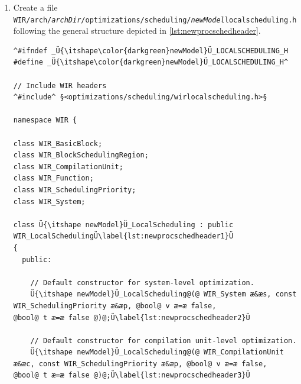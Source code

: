 \begin{enumerate}
\begin{lstlisting}[style=code,float=!ht,xleftmargin=10mm,aboveskip=-0.8 \baselineskip,belowskip=-0.8 \baselineskip]
Ü{\itshape archDir}Üschedincludedir     = ${includedir}/arch/Ü{\itshape archDir}Ü/optimizations/scheduling
Ü{\itshape archDir}Üschedinclude_HEADERS= arch/Ü{\itshape archDir}Ü/optimizations/scheduling/Ü{\itshape newModel}Üblockschedulingregion.h \
                             arch/Ü{\itshape archDir}Ü/optimizations/scheduling/Ü{\itshape newModel}Ülocalscheduling.h \
                             arch/Ü{\itshape archDir}Ü/optimizations/scheduling/Ü{\itshape newModel}Ümaxdelaypriority.h \
                             arch/Ü{\itshape archDir}Ü/optimizations/scheduling/Ü{\itshape newModel}Ümobilitypriority.h \
                             arch/Ü{\itshape archDir}Ü/optimizations/scheduling/Ü{\itshape newModel}Ünoofsuccspriority.h
\end{lstlisting}

  \item Create a file \texttt{WIR/arch/{\itshape archDir}/optimizations/scheduling/{\itshape newModel}localscheduling.h} following the general structure depicted in \cref{lst:newprocschedheader}.

\begin{lstlisting}[style=code,float=!t,caption={Header File for a New Processor Model's Local Instruction Scheduler},label=lst:newprocschedheader]
^#ifndef _Ü{\itshape\color{darkgreen}newModel}Ü_LOCALSCHEDULING_H
#define _Ü{\itshape\color{darkgreen}newModel}Ü_LOCALSCHEDULING_H^

// Include WIR headers
^#include^ §<optimizations/scheduling/wirlocalscheduling.h>§

namespace WIR {

class WIR_BasicBlock;
class WIR_BlockSchedulingRegion;
class WIR_CompilationUnit;
class WIR_Function;
class WIR_SchedulingPriority;
class WIR_System;

class Ü{\itshape newModel}Ü_LocalScheduling : public WIR_LocalSchedulingÜ\label{lst:newprocschedheader1}Ü
{
  public:

    // Default constructor for system-level optimization.
    Ü{\itshape newModel}Ü_LocalScheduling@(@ WIR_System æ&æs, const WIR_SchedulingPriority æ&æp, @bool@ v æ=æ false,                                           @bool@ t æ=æ false @)@;Ü\label{lst:newprocschedheader2}Ü

    // Default constructor for compilation unit-level optimization.
    Ü{\itshape newModel}Ü_LocalScheduling@(@ WIR_CompilationUnit æ&æc, const WIR_SchedulingPriority æ&æp, @bool@ v æ=æ false,                                  @bool@ t æ=æ false @)@;Ü\label{lst:newprocschedheader3}Ü


\end{lstlisting}
\end{enumerate}
